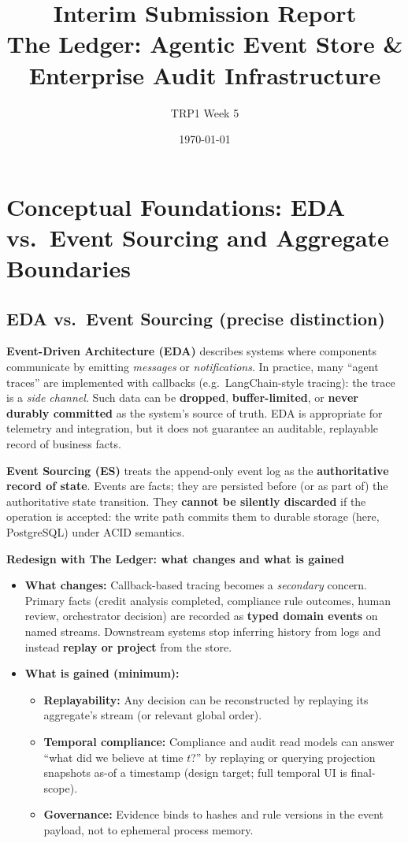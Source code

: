 \documentclass[11pt,a4paper]{article}
\title{\textbf{Interim Submission Report}\\[0.5em]
\large The Ledger: Agentic Event Store \& Enterprise Audit Infrastructure}
\author{TRP1 Week 5}
\date{\today}
\begin{document}
\maketitle
\tableofcontents
\newpage

\section{Conceptual Foundations: EDA vs.\ Event Sourcing and Aggregate Boundaries}

\subsection{EDA vs.\ Event Sourcing (precise distinction)}

\textbf{Event-Driven Architecture (EDA)} describes systems where components communicate by emitting \emph{messages} or \emph{notifications}. In practice, many ``agent traces'' are implemented with callbacks (e.g.\ LangChain-style tracing): the trace is a \emph{side channel}. Such data can be \textbf{dropped}, \textbf{buffer-limited}, or \textbf{never durably committed} as the system's source of truth. EDA is appropriate for telemetry and integration, but it does not guarantee an auditable, replayable record of business facts.

\textbf{Event Sourcing (ES)} treats the append-only event log as the \textbf{authoritative record of state}. Events are facts; they are persisted before (or as part of) the authoritative state transition. They \textbf{cannot be silently discarded} if the operation is accepted: the write path commits them to durable storage (here, PostgreSQL) under ACID semantics.

\textbf{Redesign with The Ledger: what changes and what is gained}
\begin{itemize}[leftmargin=*]
  \item \textbf{What changes:} Callback-based tracing becomes a \emph{secondary} concern. Primary facts (credit analysis completed, compliance rule outcomes, human review, orchestrator decision) are recorded as \textbf{typed domain events} on named streams. Downstream systems stop inferring history from logs and instead \textbf{replay or project} from the store.
  \item \textbf{What is gained (minimum):}
    \begin{itemize}
      \item \textbf{Replayability:} Any decision can be reconstructed by replaying its aggregate's stream (or relevant global order).
      \item \textbf{Temporal compliance:} Compliance and audit read models can answer ``what did we believe at time $t$?'' by replaying or querying projection snapshots as-of a timestamp (design target; full temporal UI is final-scope).
      \item \textbf{Governance:} Evidence binds to hashes and rule versions in the event payload, not to ephemeral process memory.
    \end{itemize}
\end{itemize}
\end{document}
